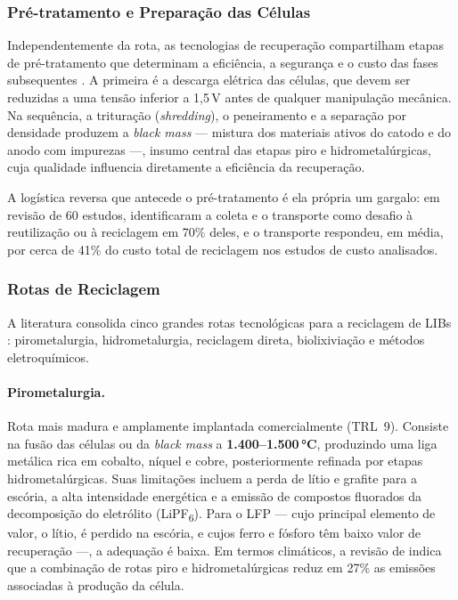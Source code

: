 \subsubsection{Pré-tratamento e Preparação das Células}
\label{subsec:pretratamento}

Independentemente da rota, as tecnologias de recuperação compartilham etapas de
pré-tratamento que determinam a eficiência, a segurança e o custo das fases
subsequentes \cite{latini2022apudhu2024}. A primeira é a descarga elétrica das
células, que devem ser reduzidas a uma tensão inferior a 1{,}5\,V antes de
qualquer manipulação mecânica. Na sequência, a trituração (\textit{shredding}), o
peneiramento e a separação por densidade produzem a \textit{black mass} —
mistura dos materiais ativos do catodo e do anodo com impurezas —, insumo central
das etapas piro e hidrometalúrgicas, cuja qualidade influencia diretamente a
eficiência da recuperação.

A logística reversa que antecede o pré-tratamento é ela própria um gargalo: em
revisão de 60 estudos,  identificaram a coleta e o
transporte como desafio à reutilização ou à reciclagem em 70\% deles, e o
transporte respondeu, em média, por cerca de 41\% do custo total de reciclagem
nos estudos de custo analisados.

\subsubsection{Rotas de Reciclagem}
\label{subsec:rotas}

A literatura consolida cinco grandes rotas tecnológicas para a reciclagem de LIBs
\cite{biswal2024,balachandran2024}: pirometalurgia, hidrometalurgia, reciclagem
direta, biolixiviação e métodos eletroquímicos.

\paragraph{Pirometalurgia.}
Rota mais madura e amplamente implantada comercialmente (TRL~9). Consiste na fusão
das células ou da \textit{black mass} a \textbf{1.400--1.500\,°C}, produzindo uma
liga metálica rica em cobalto, níquel e cobre, posteriormente refinada por etapas
hidrometalúrgicas. Suas limitações incluem a perda de lítio e grafite para a
escória, a alta intensidade energética e a emissão de compostos fluorados da
decomposição do eletrólito (LiPF\textsubscript{6}). Para o LFP — cujo principal
elemento de valor, o lítio, é perdido na escória, e cujos ferro e fósforo têm
baixo valor de recuperação —, a adequação é baixa. Em termos climáticos, a revisão
de  indica que a combinação de rotas piro e
hidrometalúrgicas reduz em 27\% as emissões associadas à produção da célula.

